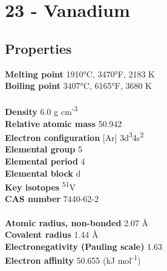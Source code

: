 \section{23 - Vanadium}
\label{sec:elem-vanadium}
\subsection{Properties}
\textbf{Melting point} 1910°C, 3470°F, 2183 K\\
\textbf{Boiling point} 3407°C, 6165°F, 3680 K\\
\\
\textbf{Density} 6.0 g cm\textsuperscript{-3}\\
\textbf{Relative atomic mass} 50.942\\
\textbf{Electron configuration} [Ar] 3d\textsuperscript{3}4s\textsuperscript{2}\\
\textbf{Elemental group} 5\\
\textbf{Elemental period} 4\\
\textbf{Elemental block} d\\
\textbf{Key isotopes} \textsuperscript{51}V\\
\textbf{CAS number} 7440-62-2 \\
\\
\textbf{Atomic radius, non-bonded} 2.07 Å\\
\textbf{Covalent radius} 1.44 Å\\
\textbf{Electronegativity (Pauling scale)} 1.63\\
\textbf{Electron affinity} 50.655 (kJ mol\textsuperscript{-1})\\